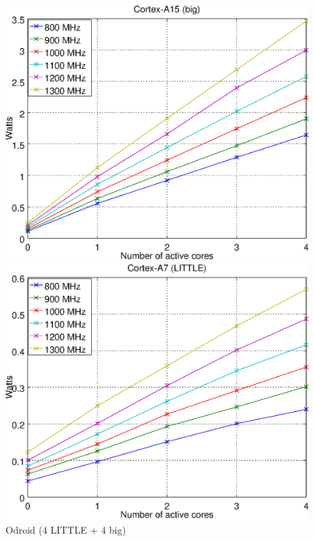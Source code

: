 \documentclass[10pt]{beamer}
\begin{document}
\begin{frame}
\begin{columns}
\begin{column}{0.4\textwidth}
    \end{column}
    \begin{column}{0.4\textwidth}
      \begin{center}
        \includegraphics[width=0.9\textwidth]{Plots/modelo_consumo/odroid_big.eps}\\
        \vspace{0.2cm}
        \includegraphics[width=0.9\textwidth]{Plots/modelo_consumo/odroid_little.eps}\\
        {\centering \footnotesize {\sc Odroid} (4 LITTLE + 4 big)}
      \end{center}
      
    \end{column}
  \end{columns}
\end{frame}
\end{document}
